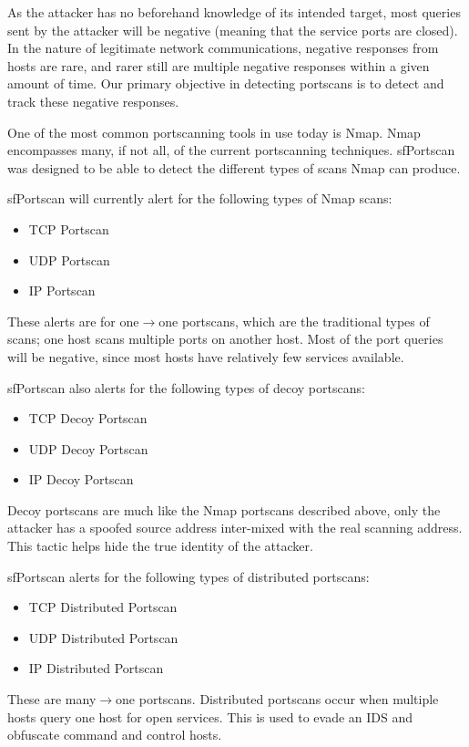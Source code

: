\documentclass[english]{report}
\begin{document}
As the attacker has no beforehand knowledge of its intended target,
most queries sent by the attacker will be negative (meaning that the
service ports are closed). In the nature of legitimate network
communications, negative responses from hosts are rare, and rarer
still are multiple negative responses within a given amount of time.
Our primary objective in detecting portscans is to detect and track
these negative responses.

One of the most common portscanning tools in use today is Nmap. Nmap
encompasses many, if not all, of the current portscanning techniques.
sfPortscan was designed to be able to detect the different types of
scans Nmap can produce.

sfPortscan will currently alert for the following types of Nmap scans:
\begin{itemize}
\item TCP Portscan
\item UDP Portscan
\item IP Portscan
\end{itemize}

These alerts are for one$\rightarrow$one portscans, which are the traditional
types of scans; one host scans multiple ports on another host. Most of
the port queries will be negative, since most hosts have relatively
few services available.

sfPortscan also alerts for the following types of decoy portscans:
\begin{itemize}
\item TCP Decoy Portscan
\item UDP Decoy Portscan
\item IP Decoy Portscan
\end{itemize}

Decoy portscans are much like the Nmap portscans described above, only the attacker has a spoofed
source address inter-mixed with the real scanning address. This tactic
helps hide the true identity of the attacker.

sfPortscan alerts for the following types of distributed portscans:
\begin{itemize}
\item TCP Distributed Portscan
\item UDP Distributed Portscan
\item IP Distributed Portscan
\end{itemize}

These are many$\rightarrow$one portscans. Distributed portscans occur when
multiple hosts query one host for open services. This is used to evade
an IDS and obfuscate command and control hosts.
\end{document}
